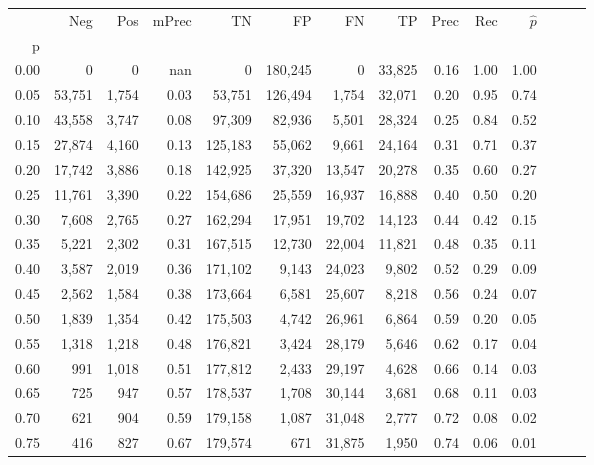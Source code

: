\begin{tabular}{rrrrrrrrrrrrrr}
\toprule
{} &     Neg &    Pos & mPrec &       TN &       FP &      FN &      TP &  Prec &   Rec & $\hat{p}$ \\
p    &         &        &       &          &          &         &         &       &       &           \\
\midrule
0.00 &       0 &      0 &   nan &        0 &  180,245 &       0 &  33,825 &  0.16 &  1.00 &      1.00 \\
0.05 &  53,751 &  1,754 &  0.03 &   53,751 &  126,494 &   1,754 &  32,071 &  0.20 &  0.95 &      0.74 \\
0.10 &  43,558 &  3,747 &  0.08 &   97,309 &   82,936 &   5,501 &  28,324 &  0.25 &  0.84 &      0.52 \\
0.15 &  27,874 &  4,160 &  0.13 &  125,183 &   55,062 &   9,661 &  24,164 &  0.31 &  0.71 &      0.37 \\
0.20 &  17,742 &  3,886 &  0.18 &  142,925 &   37,320 &  13,547 &  20,278 &  0.35 &  0.60 &      0.27 \\
0.25 &  11,761 &  3,390 &  0.22 &  154,686 &   25,559 &  16,937 &  16,888 &  0.40 &  0.50 &      0.20 \\
0.30 &   7,608 &  2,765 &  0.27 &  162,294 &   17,951 &  19,702 &  14,123 &  0.44 &  0.42 &      0.15 \\
0.35 &   5,221 &  2,302 &  0.31 &  167,515 &   12,730 &  22,004 &  11,821 &  0.48 &  0.35 &      0.11 \\
0.40 &   3,587 &  2,019 &  0.36 &  171,102 &    9,143 &  24,023 &   9,802 &  0.52 &  0.29 &      0.09 \\
0.45 &   2,562 &  1,584 &  0.38 &  173,664 &    6,581 &  25,607 &   8,218 &  0.56 &  0.24 &      0.07 \\
0.50 &   1,839 &  1,354 &  0.42 &  175,503 &    4,742 &  26,961 &   6,864 &  0.59 &  0.20 &      0.05 \\
0.55 &   1,318 &  1,218 &  0.48 &  176,821 &    3,424 &  28,179 &   5,646 &  0.62 &  0.17 &      0.04 \\
0.60 &     991 &  1,018 &  0.51 &  177,812 &    2,433 &  29,197 &   4,628 &  0.66 &  0.14 &      0.03 \\
0.65 &     725 &    947 &  0.57 &  178,537 &    1,708 &  30,144 &   3,681 &  0.68 &  0.11 &      0.03 \\
0.70 &     621 &    904 &  0.59 &  179,158 &    1,087 &  31,048 &   2,777 &  0.72 &  0.08 &      0.02 \\
0.75 &     416 &    827 &  0.67 &  179,574 &      671 &  31,875 &   1,950 &  0.74 &  0.06 &      0.01 \\

\end{tabular}

